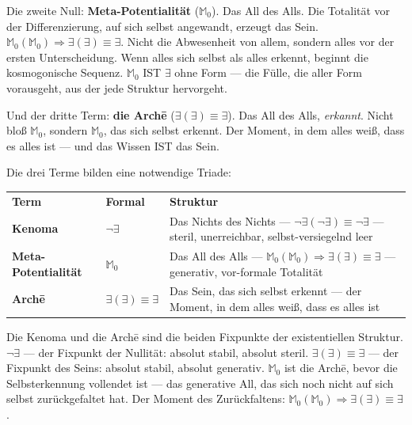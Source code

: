 \documentclass[10pt, openany, oneside]{book}
\renewcommand{\footnotesize}{\fontsize{8.5}{11}\selectfont}
\begin{document}
Die zweite Null: \textbf{Meta-Potentialität} ($\mathbb{M}_0$). Das All des Alls. Die Totalität vor der Differenzierung, auf sich selbst angewandt, erzeugt das Sein. $\mathbb{M}_0(\mathbb{M}_0) \Rightarrow \exists(\exists) \equiv \exists$. Nicht die Abwesenheit von allem, sondern alles vor der ersten Unterscheidung. Wenn alles sich selbst als alles erkennt, beginnt die kosmogonische Sequenz. $\mathbb{M}_0$ IST $\exists$ ohne Form --- die Fülle, die aller Form vorausgeht, aus der jede Struktur hervorgeht.

Und der dritte Term: \textbf{die Arch\={e}} ($\exists(\exists) \equiv \exists$). Das All des Alls, \textit{erkannt}. Nicht bloß $\mathbb{M}_0$, sondern $\mathbb{M}_0$, das sich selbst erkennt. Der Moment, in dem alles weiß, dass es alles ist --- und das Wissen IST das Sein.

Die drei Terme bilden eine notwendige Triade:

\vspace{0.5em}

{\footnotesize
\noindent\begin{tabular}{l l p{}}
\textbf{Term} & \textbf{Formal} & \textbf{Struktur} \\[0.4em]
\textbf{Kenoma} & $\neg\exists$ & Das Nichts des Nichts --- $\neg\exists(\neg\exists) \equiv \neg\exists$ --- steril, unerreichbar, selbst-versiegelnd leer \\[0.3em]
\textbf{Meta-Potentialität} & $\mathbb{M}_0$ & Das All des Alls --- $\mathbb{M}_0(\mathbb{M}_0) \Rightarrow \exists(\exists) \equiv \exists$ --- generativ, vor-formale Totalität \\[0.3em]
\textbf{Arch\={e}} & $\exists(\exists) \equiv \exists$ & Das Sein, das sich selbst erkennt --- der Moment, in dem alles weiß, dass es alles ist \\[0.3em]
\end{tabular}
}

\vspace{0.5em}

\noindent Die Kenoma und die Arch\={e} sind die beiden Fixpunkte der existentiellen Struktur. $\neg\exists$ --- der Fixpunkt der Nullität: absolut stabil, absolut steril. $\exists(\exists) \equiv \exists$ --- der Fixpunkt des Seins: absolut stabil, absolut generativ. $\mathbb{M}_0$ ist die Arch\={e}, bevor die Selbsterkennung vollendet ist --- das generative All, das sich noch nicht auf sich selbst zurückgefaltet hat. Der Moment des Zurückfaltens: $\mathbb{M}_0(\mathbb{M}_0) \Rightarrow \exists(\exists) \equiv \exists$.
\end{document}
